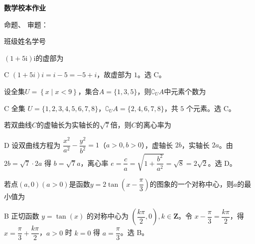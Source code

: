 \documentclass[12pt,a4paper]{article}%
\begin{document}
\begin{center}
	{\Large \textbf{数学校本作业}}

	命题、 审题：

	班级\blank{3cm}姓名\blank{3cm}学号\blank{3cm}
\end{center}



\begin{question}
$(1+5\text{i})\text{i}$的虚部为\choiceBox
{}
\end{question}
\begin{answer}{C}
$(1+5i)i=i-5=-5+i$，故虚部为 $1$。选 C。
\end{answer}

\begin{question}
设全集$U=\left\{ x\mid x<9 \right\}$，集合$A=\{1,3,5\}$，则$\complement_U A$中元素个数为\choiceBox
{}
\end{question}
\begin{answer}{C}
全集 $U=\{1,2,3,4,5,6,7,8\}$，$\complement_UA=\{2,4,6,7,8\}$，共 $5$ 个元素。选 C。
\end{answer}

\begin{question}
若双曲线$C$的虚轴长为实轴长的$\sqrt{7}$倍，则$C$的离心率为\choiceBox
{}
\end{question}
\begin{answer}{D}
设双曲线方程为 $\dfrac{x^2}{a^2}-\dfrac{y^2}{b^2}=1$（$a>0,b>0$），虚轴长 $2b$，实轴长 $2a$。由 $2b=\sqrt{7}\cdot2a$ 得 $b=\sqrt{7}a$，离心率 $e=\dfrac{c}{a}=\sqrt{1+\dfrac{b^2}{a^2}}=\sqrt{8}=2\sqrt{2}$。选 D。
\end{answer}

\begin{question}
若点$(a,0)(a>0)$是函数$y=2\tan \left( x-\dfrac{\pi}{3} \right)$的图象的一个对称中心，则$a$的最小值为\choiceBox
{}
\end{question}
\begin{answer}{B}
正切函数 $y=\tan(x)$ 的对称中心为 $\left(\dfrac{k\pi}{2},0\right),k\in\mathbf{Z}$。令 $x-\dfrac{\pi}{3}=\dfrac{k\pi}{2}$，得 $x=\dfrac{\pi}{3}+\dfrac{k\pi}{2}$，$a>0$ 时 $k=0$ 得 $a=\dfrac{\pi}{3}$。选 B。
\end{answer}
\end{document}
